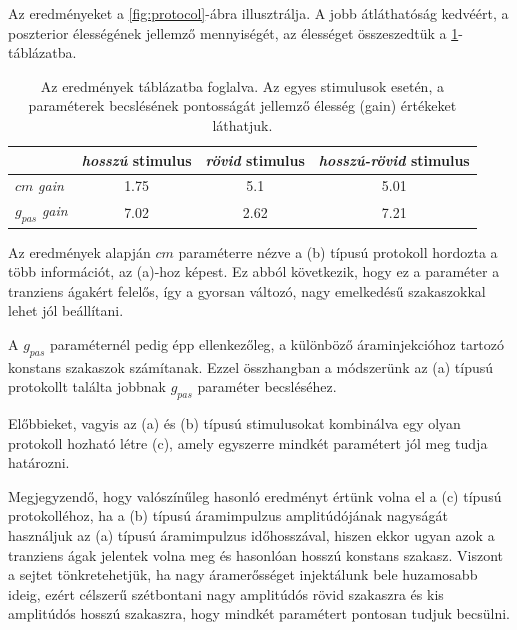 Az eredményeket a \ref{fig:protocol}-ábra illusztrálja. A jobb átláthatóság kedvéért, a poszterior élességének jellemző mennyiségét, az élességet összeszedtük a \ref{tab:res}-táblázatba. 

\begin{table}[h!]
	\centering
	\begin{tabular}{@{}|l|c|c|c|@{}}
		\toprule
		& \textit{hosszú} stimulus & \textit{rövid} stimulus & \textit{hosszú-rövid} stimulus \\ \midrule
		$cm$ \textit{gain}   & 1.75   & 5.1   & 5.01         \\
		$g_{pas}$ \textit{gain} & 7.02   & 2.62  & 7.21         \\ \bottomrule
	\end{tabular}
	\caption{Az eredmények táblázatba foglalva. Az egyes stimulusok esetén, a paraméterek becslésének pontosságát jellemző élesség (gain) értékeket láthatjuk.}
\label{tab:res}
\end{table}

Az eredmények alapján $cm$ paraméterre nézve a (b) típusú protokoll hordozta a több információt, az (a)-hoz képest. Ez abból következik, hogy ez a paraméter a tranziens ágakért felelős, így a gyorsan változó, nagy emelkedésű szakaszokkal lehet jól beállítani. 

A $g_{pas}$ paraméternél pedig épp ellenkezőleg, a különböző áraminjekcióhoz tartozó konstans szakaszok számítanak. Ezzel összhangban a módszerünk az (a) típusú protokollt találta jobbnak $g_{pas}$ paraméter becsléséhez.

Előbbieket, vagyis az (a) és (b) típusú stimulusokat kombinálva egy olyan protokoll hozható létre (c), amely egyszerre mindkét paramétert jól meg tudja határozni.

Megjegyzendő, hogy valószínűleg hasonló eredményt értünk volna el a (c) típusú protokolléhoz, ha a (b) típusú áramimpulzus amplitúdójának nagyságát használjuk az (a) típusú áramimpulzus időhosszával, hiszen ekkor ugyan azok a tranziens ágak jelentek volna meg és hasonlóan hosszú konstans szakasz. Viszont a sejtet tönkretehetjük, ha nagy áramerősséget injektálunk bele huzamosabb ideig, ezért célszerű szétbontani nagy amplitúdós rövid szakaszra és kis amplitúdós hosszú szakaszra, hogy mindkét paramétert pontosan tudjuk becsülni.
%

